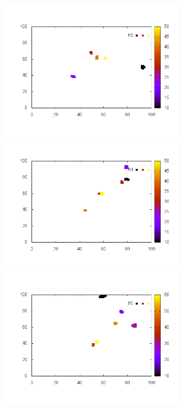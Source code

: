 \documentclass[10pt,a4paper]{article}
\begin{document}
\begin{figure}
\begin{subfigure}[b]{1\textwidth}
\includegraphics[scale=.3]{./img/SCC_Stable3/cut90p/3.png}
\includegraphics[scale=.3]{./img/SCC_Stable3/cut90p/4.png}
\includegraphics[scale=.3]{./img/SCC_Stable3/cut90p/5.png}
\end{subfigure}


\end{figure}
\end{document}
